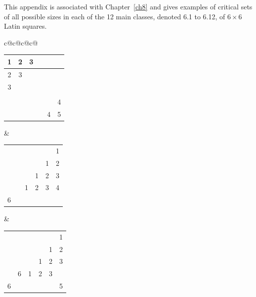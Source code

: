 \documentclass[12pt]{report}
\begin{document}
This appendix is associated with Chapter~\ref{ch8} and gives examples of 
critical sets of all possible sizes in each of the 12 main classes,
denoted 6.1 to 6.12, of $6 \times 6$ Latin squares.

\begin{footnotesize}
\begin{center}
\begin{tabular}{c@{\hspace{1.0mm}}c@{\hspace{1.0mm}}c@{\hspace{1.0mm}}c@{\hspace{1.0mm}}}
\begin{tabular}{|c|c|c|c|c|c|}
\hline 1 & 2 & 3 & \ecell & \ecell & \ecell \\
\hline 2 & 3 & \ecell & \ecell & \ecell & \ecell \\
\hline 3 & \ecell & \ecell & \ecell & \ecell & \ecell \\
\hline \ecell & \ecell & \ecell & \ecell & \ecell & \ecell \\
\hline \ecell & \ecell & \ecell & \ecell & \ecell & 4 \\
\hline \ecell & \ecell & \ecell & \ecell & 4 & 5 \\
\hline 
\end{tabular} &
\begin{tabular}{|c|c|c|c|c|c|}
\hline \ecell & \ecell & \ecell & \ecell & \ecell & \ecell \\
\hline \ecell & \ecell & \ecell & \ecell & \ecell & 1 \\
\hline \ecell & \ecell & \ecell & \ecell & 1 & 2 \\
\hline \ecell & \ecell & \ecell & 1 & 2 & 3 \\
\hline \ecell & \ecell & 1 & 2 & 3 & 4 \\
\hline 6 & \ecell & \ecell & \ecell & \ecell & \ecell \\
\hline 
\end{tabular} &
\begin{tabular}{|c|c|c|c|c|c|}
\hline \ecell & \ecell & \ecell & \ecell & \ecell & \ecell \\
\hline \ecell & \ecell & \ecell & \ecell & \ecell & 1 \\
\hline \ecell & \ecell & \ecell & \ecell & 1 & 2 \\
\hline \ecell & \ecell & \ecell & 1 & 2 & 3 \\
\hline \ecell & 6 & 1 & 2 & 3 & \ecell \\
\hline 6 & \ecell & \ecell & \ecell & \ecell & 5 \\

\end{tabular}
\end{tabular}
\end{center}
\end{footnotesize}
\end{document}
